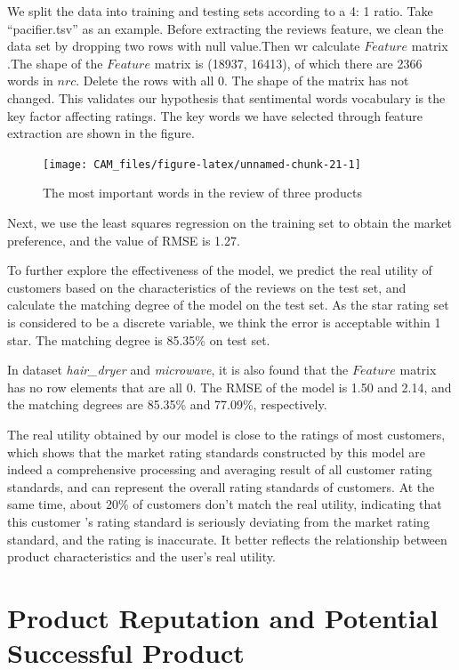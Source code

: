 \documentclass[12pt,a4paper,]{article}
\begin{document}
We split the data into training and testing sets according to a 4: 1
ratio. Take ``pacifier.tsv'' as an example. Before extracting the
reviews feature, we clean the data set by dropping two rows with null
value.Then wr calculate \(Feature\) matrix .The shape of the \(Feature\)
matrix is (18937, 16413), of which there are 2366 words in \(nrc\).
Delete the rows with all 0. The shape of the matrix has not changed.
This validates our hypothesis that sentimental words vocabulary is the
key factor affecting ratings. The key words we have selected through
feature extraction are shown in the figure.

\begin{figure}

{\centering \texttt{[image: CAM\_files/figure-latex/unnamed-chunk-21-1]} 

}

\caption{The most important words in the review of three products}\label{fig:unnamed-chunk-21}
\end{figure}

Next, we use the least squares regression on the training set to obtain
the market preference, and the value of RMSE is 1.27.

To further explore the effectiveness of the model, we predict the real
utility of customers based on the characteristics of the reviews on the
test set, and calculate the matching degree of the model on the test
set. As the star rating set is considered to be a discrete variable, we
think the error is acceptable within 1 star. The matching degree is
85.35\% on test set.

In dataset \emph{hair\_dryer} and \emph{microwave}, it is also found
that the \(Feature\) matrix has no row elements that are all 0. The RMSE
of the model is 1.50 and 2.14, and the matching degrees are 85.35\% and
77.09\%, respectively.

The real utility obtained by our model is close to the ratings of most
customers, which shows that the market rating standards constructed by
this model are indeed a comprehensive processing and averaging result of
all customer rating standards, and can represent the overall rating
standards of customers. At the same time, about 20\% of customers don't
match the real utility, indicating that this customer 's rating standard
is seriously deviating from the market rating standard, and the rating
is inaccurate. It better reflects the relationship between product
characteristics and the user's real utility.

\hypertarget{product-reputation-and-potential-successful-product}{%
\section{Product Reputation and Potential Successful
Product}\label{product-reputation-and-potential-successful-product}}
\end{document}
